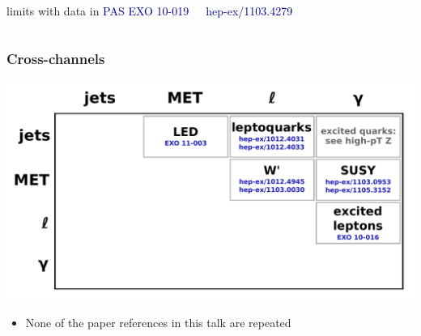 \documentclass[compress]{beamer}
\begin{document}
\begin{frame}
\begin{columns}
limits with data in \textcolor{darkblue}{\scriptsize PAS EXO 10-019}

\textcolor{darkblue}{\scriptsize hep-ex/1103.4279}
\end{columns}


\end{frame}

\begin{frame}
\frametitle{Cross-channels}

\includegraphics[width=\linewidth]{cross-channels.pdf}

\begin{itemize}
\item<2-> None of the paper references in this talk are repeated
\end{itemize}
\end{frame}
\end{document}
